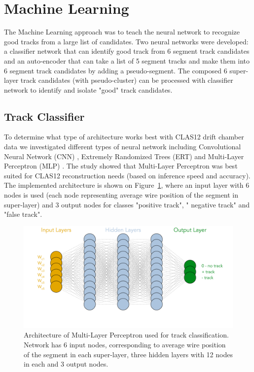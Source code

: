 \section{Machine Learning}

The Machine Learning approach was to teach the neural network to recognize good tracks
 from a large list of candidates. 
 Two neural networks were developed: a classifier network that can identify good track from  6 segment
 track candidates  and an auto-encoder that can take a list of 5 segment tracks and make them into 6 segment 
 track candidates by adding a pseudo-segment. The composed 6 super-layer track candidates (with pseudo-cluster)
 can be processed with classifier network to identify and isolate "good" track candidates.

 
 \subsection{Track Classifier}
 
 To determine what type of architecture works best with CLAS12 drift chamber data we investigated different 
 types of neural network including Convolutional Neural Network (CNN) , Extremely Randomized Trees (ERT) and 
 Multi-Layer Perceptron (MLP) \cite{Gavalian:2020oxg}. The study showed that Multi-Layer Perceptron was best suited for 
 CLAS12 reconstruction needs (based on inference speed and accuracy). The implemented architecture is shown on 
 Figure~\ref{mlp:architecture}, where an input layer with 6 nodes is used (each node representing average wire position 
 of the segment in super-layer) and 3 output nodes for classes "positive track", " negative track" and "false track".
 
 \begin{figure}[!ht]
\begin{center}
  \includegraphics[width=4.5in]{images/mlp_diagram.pdf}
\caption {Architecture of Multi-Layer Perceptron used for track classification. Network has 6 input nodes, corresponding to average wire position of the segment in each super-layer, three hidden layers with 12 nodes in each and 3 output nodes.}
 \label{mlp:architecture}
 \end{center}
\end{figure}

